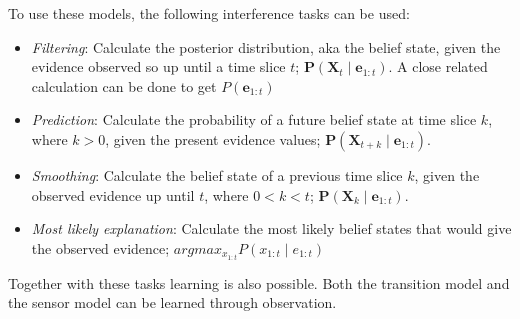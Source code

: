\documentclass[11pt, letterpaper]{report}
\numberwithin{equation}{section}
\begin{document}
To use these models, the following interference tasks can be used:
\begin{itemize}
\item \emph{Filtering}: Calculate the posterior distribution, aka the belief
  state, given the evidence observed so up until a time slice $t$;
  $\boldsymbol{P}(\boldsymbol{X}_t \mid \boldsymbol{e}_{1:t})$. A close related
  calculation can be done to get $P(\boldsymbol{e}_{1:t})$
\item \emph{Prediction}: Calculate the probability of a future belief state at
  time slice $k$, where $k > 0$, given the present evidence values;
  $\boldsymbol{P}(\boldsymbol{X}_{t+k} \mid \boldsymbol{e}_{1:t})$.
\item \emph{Smoothing}: Calculate the belief state of a previous time slice $k$,
  given the observed evidence up until $t$, where $0 < k < t$;
  $\boldsymbol{P}(\boldsymbol{X}_{k} \mid \boldsymbol{e}_{1:t})$.
\item \emph{Most likely explanation}: Calculate the most likely belief states
  that would give the observed evidence;
  $argmax_{x_{1:t}}P(x_{1:t} \mid e_{1:t})$
\end{itemize}
Together with these tasks learning is also possible. Both the transition model
and the sensor model can be learned through observation.
\end{document}
